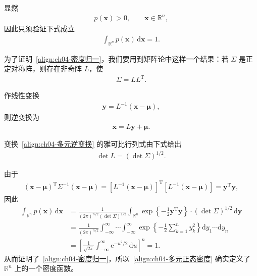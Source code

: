 \documentclass[../../main.tex]{subfiles}
\begin{document}
显然
\begin{align}
p(\boldsymbol{x})>0,\qquad \boldsymbol{x}\in\mathbb{R}^n,\label{align:ch04-密度正}
\end{align}
因此只须验证下式成立
\begin{align}
\int_{\mathbb{R}^n}p(\boldsymbol{x})\,\mathrm{d}\boldsymbol{x}=1.\label{align:ch04-密度归一}
\end{align}

为了证明~\eqref{align:ch04-密度归一}，我们要用到矩阵论中这样一个结果：若 $\Sigma$ 是正定对称阵，则存在非奇阵 $L$，使
\begin{align}
\Sigma=LL^{\mathrm{T}}.\label{align:ch04-Cholesky}
\end{align}

作线性变换
\begin{align}
\boldsymbol{y}=L^{-1}(\boldsymbol{x}-\boldsymbol{\mu}),\label{align:ch04-多元正态变换}
\end{align}
则逆变换为
\begin{align}
\boldsymbol{x}=L\boldsymbol{y}+\boldsymbol{\mu}.\label{align:ch04-多元逆变换}
\end{align}

变换~\eqref{align:ch04-多元逆变换} 的雅可比行列式由下式给出
\begin{align}
\det L=(\det\Sigma)^{1/2}.\label{align:ch04-雅可比}
\end{align}

由于
\begin{align}
(\boldsymbol{x}-\boldsymbol{\mu})^{\mathrm{T}}\Sigma^{-1}(\boldsymbol{x}-\boldsymbol{\mu})
=[L^{-1}(\boldsymbol{x}-\boldsymbol{\mu})]^{\mathrm{T}}[L^{-1}(\boldsymbol{x}-\boldsymbol{\mu})]=\boldsymbol{y}^{\mathrm{T}}\boldsymbol{y},\label{align:ch04-二次型化简}
\end{align}
因此
\begin{align*}
\int_{\mathbb{R}^n}p(\boldsymbol{x})\,\mathrm{d}\boldsymbol{x}
&=\frac{1}{(2\pi)^{n/2}(\det\Sigma)^{1/2}}\int_{\mathbb{R}^n}\exp\left\{-\frac12\boldsymbol{y}^{\mathrm{T}}\boldsymbol{y}\right\}\cdot(\det\Sigma)^{1/2}\,\mathrm{d}\boldsymbol{y}\\
&=\frac{1}{(2\pi)^{n/2}}\int_{-\infty}^{\infty}\cdots\int_{-\infty}^{\infty}\exp\left\{-\frac12\sum_{k=1}^n y_k^2\right\}\mathrm{d}y_1\cdots\mathrm{d}y_n\\
&=\left[\frac{1}{\sqrt{2\pi}}\int_{-\infty}^{\infty}\mathrm{e}^{-u^2/2}\,\mathrm{d}u\right]^n=1.
\end{align*}
从而证明了~\eqref{align:ch04-密度归一}，所以~\eqref{align:ch04-多元正态密度} 确实定义了 $\mathbb{R}^n$ 上的一个密度函数。
\end{document}
